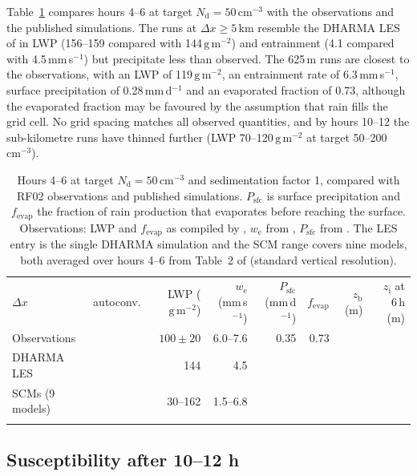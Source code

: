 \documentclass[acp, manuscript]{copernicus}
\newcommand{\Nd}{N_\mathrm{d}}
\newcommand{\we}{w_\mathrm{e}}
\newcommand{\zi}{z_\mathrm{i}}
\newcommand{\zb}{z_\mathrm{b}}
\newcommand{\dx}{\Delta x}
\newcommand{\cmthree}{\mathrm{cm^{-3}}}
\newcommand{\gmm}{\mathrm{g\,m^{-2}}}
\begin{document}
Table~\ref{tab:obs} compares hours 4--6 at target $\Nd=50\,\cmthree$ with the observations and the published simulations. The runs at $\dx\geq5$\,km resemble the DHARMA LES of \citet{wyant2007} in LWP (156--159 compared with 144\,$\gmm$) and entrainment (4.1 compared with 4.5\,mm\,s$^{-1}$) but precipitate less than observed. The 625\,m runs are closest to the observations, with an LWP of 119\,$\gmm$, an entrainment rate of 6.3\,mm\,s$^{-1}$, surface precipitation of 0.28\,mm\,d$^{-1}$ and an evaporated fraction of 0.73, although the evaporated fraction may be favoured by the assumption that rain fills the grid cell. No grid spacing matches all observed quantities, and by hours 10--12 the sub-kilometre runs have thinned further (LWP 70--120\,$\gmm$ at target 50--200\,$\cmthree$).

\begin{table}[t]
\caption{Hours 4--6 at target $\Nd=50\,\cmthree$ and sedimentation factor 1, compared with RF02 observations and published simulations. $P_\mathrm{sfc}$ is surface precipitation and $f_\mathrm{evap}$ the fraction of rain production that evaporates before reaching the surface. Observations: LWP and $f_\mathrm{evap}$ as compiled by \citet{wyant2007}, $\we$ from \citet{faloona2005}, $P_\mathrm{sfc}$ from \citet{vanzanten2005}. The LES entry is the single DHARMA simulation and the SCM range covers nine models, both averaged over hours 4--6 from Table~2 of \citet{wyant2007} (standard vertical resolution).}\label{tab:obs}
\begin{tabular}{llrrrrrr}
\tophline
$\dx$ & autoconv. & LWP ($\gmm$) & $\we$ (mm\,s$^{-1}$) & $P_\mathrm{sfc}$ (mm\,d$^{-1}$) & $f_\mathrm{evap}$ & $\zb$ (m) & $\zi$ at 6\,h (m) \\
\middlehline

Observations & & $100\pm20$ & 6.0--7.6 & 0.35 & 0.73 & & \\
DHARMA LES & & 144 & 4.5 & & & & \\
SCMs (9 models) & & 30--162 & 1.5--6.8 & & & & \\
\bottomhline
\end{tabular}
\end{table}

\subsection{Susceptibility after 10--12 h}\label{sec:susc}
\end{document}
